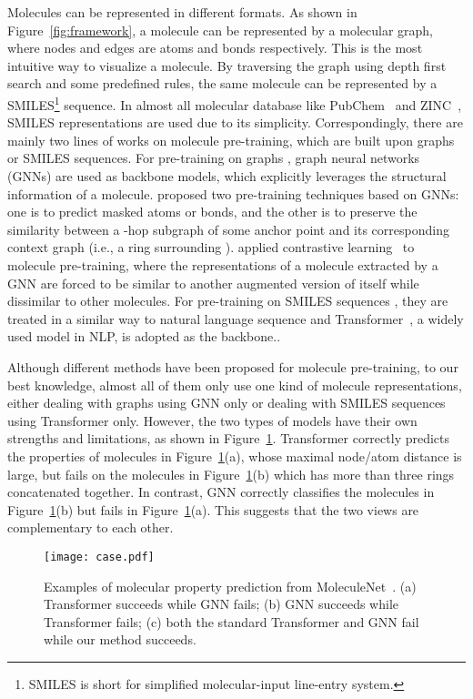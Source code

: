 \documentclass{article}
\begin{document}
Molecules can be represented in different formats. As shown in Figure~\ref{fig:framework}, a molecule can be represented by a molecular graph, where nodes and edges are atoms and bonds respectively. This is the most intuitive way to visualize a molecule. By traversing the graph using depth first search and some predefined rules, the same molecule can be represented by a SMILES\footnote{SMILES is short for simplified molecular-input line-entry system.} \cite{weininger1988smiles} sequence. In almost all molecular database like PubChem~\cite{10.1093/nar/gkaa971} and ZINC~\cite{doi:10.1021/ci049714}, SMILES representations are used due to its simplicity. Correspondingly, there are mainly two lines of works on molecule pre-training, which are built upon graphs or  SMILES sequences. For pre-training on graphs \citep{hu2019strategies,liu2019ngram,wang2021molclr}, graph neural networks (GNNs) are used as backbone models, which explicitly leverages the structural information of a molecule. \citet{hu2019strategies} proposed two pre-training techniques based on GNNs: one is to predict masked atoms or bonds, and the other is to preserve the similarity between a -hop subgraph of some anchor point  and its corresponding context graph (i.e., a ring surrounding ). \citet{wang2021molclr} applied contrastive learning~\cite{1640964} to molecule pre-training, where the representations of a molecule extracted by a GNN are forced to be similar to another augmented version of itself while dissimilar to other molecules. For pre-training on SMILES sequences \citep{chithrananda2020chemberta}, they are treated in a similar way to natural language sequence and Transformer~\cite{vaswani2017attention}, a widely used model in NLP, is adopted as the backbone.. 

Although different methods have been proposed for molecule pre-training, to our best knowledge, almost all of them only use one kind of molecule representations, either dealing with graphs using GNN only or dealing with SMILES sequences using Transformer only. However, the two types of models have their own strengths and limitations, as shown in Figure~\ref{fig:case_study_in_motivation}. Transformer correctly predicts the properties of molecules in Figure~\ref{fig:case_study_in_motivation}(a), whose maximal node/atom distance is large, but fails on the molecules in Figure~\ref{fig:case_study_in_motivation}(b) which has more than three rings concatenated together.
In contrast, GNN correctly classifies the molecules in Figure~\ref{fig:case_study_in_motivation}(b) but fails in Figure~\ref{fig:case_study_in_motivation}(a). This suggests that the two views are complementary to each other.
\begin{figure}[!ht]
    \centering
    \texttt{[image: case.pdf]}
    \caption{Examples of molecular property prediction from MoleculeNet~\cite{wu2018moleculenet}. (a) Transformer succeeds while GNN fails; (b) GNN succeeds while Transformer fails; (c) both the standard Transformer and GNN fail while our method succeeds. }
    \label{fig:case_study_in_motivation}
\end{figure}
\end{document}
